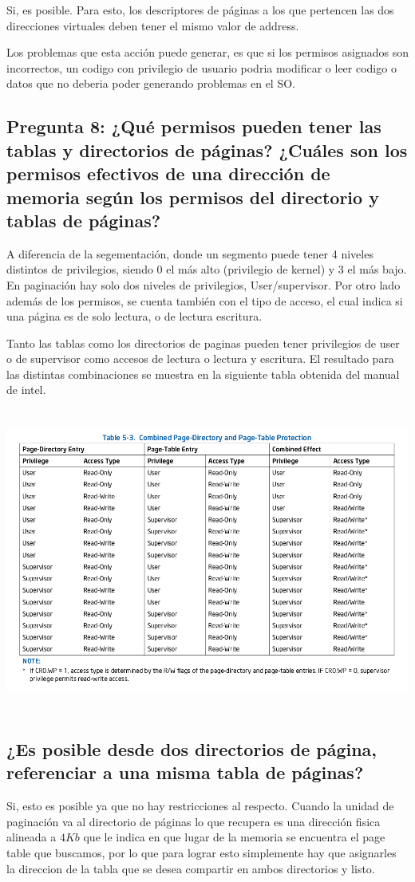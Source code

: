 \documentclass[a4paper,10pt,twoside]{article}
\begin{document}
Si, es posible. Para esto, los descriptores de páginas a los que pertencen las dos direcciones virtuales deben tener el mismo valor de address.

Los problemas que esta acción puede generar, es que si los permisos asignados son incorrectos, un codigo con privilegio de usuario podria modificar o leer codigo o datos que no deberia poder generando problemas en el SO.


\subsection{Pregunta 8: ¿Qué permisos pueden tener las tablas y directorios de páginas? ¿Cuáles
son los permisos efectivos de una dirección de memoria según los permisos del directorio
y tablas de páginas?}

A diferencia de la segementación, donde un segmento puede tener 4 niveles distintos de privilegios, siendo 0 el más alto (privilegio de kernel) y 3 el más bajo. En paginación hay solo dos niveles de privilegios, User/supervisor. Por otro lado además de los permisos, se cuenta también con el tipo de acceso, el cual indica si una página es de solo lectura, o de lectura escritura.

Tanto las tablas como los directorios de paginas pueden tener privilegios de user o de supervisor como accesos de lectura o lectura y escritura. El resultado para las distintas combinaciones se muestra en la siguiente tabla obtenida del manual de intel.

\includegraphics[height=10cm]{privilegios.png} 

\subsection{¿Es posible desde dos directorios de página, referenciar a una misma tabla de páginas?}
Si, esto es posible ya que no hay restricciones al respecto. Cuando la unidad de paginación va al directorio de páginas lo que recupera es una dirección fisica alineada a $4Kb$ que le indica en que lugar de la memoria se encuentra el page table que buscamos, por lo que para lograr esto simplemente hay que asignarles la direccion de la tabla que se desea compartir en ambos directorios y listo.
\end{document}
